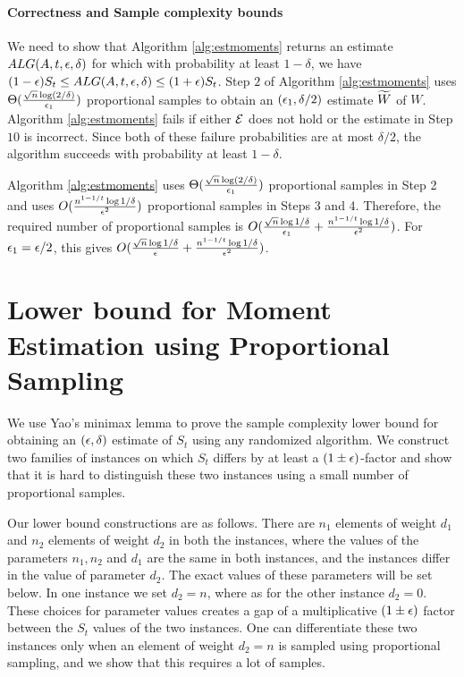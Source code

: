 \paragraph{Correctness and Sample complexity bounds}

We need to show that Algorithm \ref{alg:estmoments} returns an estimate $ALG(A,t,\epsilon,\delta)$ for which with probability at least $1-\delta$, we have $(1-\epsilon)S_t\leq ALG(A,t,\epsilon,\delta)\leq (1+\epsilon)S_t$. Step $2$ of Algorithm \ref{alg:estmoments} uses $\Theta{(\frac{\sqrt{n}\log (2/\delta)}{\epsilon_1})}$ proportional samples to obtain an $(\epsilon_1,\delta/2)$ estimate $\widetilde{W}$ of $W$. Algorithm \ref{alg:estmoments} fails if either $\mathcal{E}$ does not hold or the estimate in Step $10$ is incorrect. Since both of these failure probabilities are at most $\delta/2$, the algorithm succeeds with probability at least $1-\delta$. 

Algorithm \ref{alg:estmoments} uses $\Theta{(\frac{\sqrt{n}\log (2/\delta)}{\epsilon_1})}$ proportional samples in Step 2 and uses $O(\frac{n^{1-1/t}\log 1/\delta}{\epsilon^2})$ proportional samples in Steps 3 and 4. Therefore, the required number of proportional samples is $O(\frac{\sqrt{n}\log 1/\delta}{\epsilon_1} + \frac{n^{1-1/t}\log 1/\delta}{\epsilon^2})$. For $\epsilon_1=\epsilon/2$, this gives $O(\frac{\sqrt{n}\log 1/\delta}{\epsilon} + \frac{n^{1-1/t}\log 1/\delta}{\epsilon^2})$.


\section{Lower bound for Moment Estimation using Proportional Sampling}\label{sec:lower-proportional}

We use Yao's minimax lemma to prove the sample complexity lower bound for obtaining an $(\epsilon,\delta)$ estimate of $S_t$ using any randomized algorithm. We construct two families of instances on which $S_t$ differs by at least a $(1\pm \epsilon)$-factor and show that it is hard to distinguish these two instances using a small number of proportional samples.

Our lower bound constructions are as follows. There are $n_1$ elements of weight $d_1$ and $n_2$ elements of weight $d_2$ in both the instances, where the values of the parameters $n_1, n_2$ and $d_1$ are the same in both instances, and the instances differ in the value of parameter $d_2$. The exact values of these parameters will be set below. In one instance we set $d_2=n$, where as for the other instance $d_2=0$. These choices for parameter values creates a gap of a multiplicative $(1\pm \epsilon)$ factor between the $S_t$ values of the two instances. One can differentiate these two instances only when an element of weight $d_2=n$ is sampled using proportional sampling, and we show that this requires a lot of samples. 

